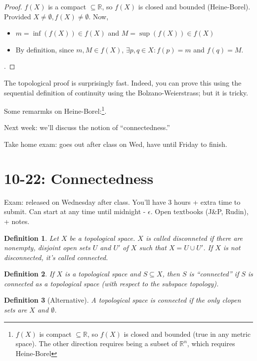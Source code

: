 \documentclass[12pt]{article}
\newtheorem*{definition}{Definition}
\newcommand{\RR}{\mathbb{R}}
\newcommand{\eps}{\epsilon}
\begin{document}
\begin{proof}
  $f(X)$ is a compact $\subseteq \RR$, so $f(X)$ is closed and bounded (Heine-Borel). Provided $X \neq \emptyset, f(X) \neq \emptyset$. Now, 
  \begin{itemize}
    \item $m = \inf (f(X) ) \in f(X)$ and $M = \sup (f(X) ) \in f(X)$
    \item By definition, since $m, M \in f(X)$, $\exists p, q \in X: f(p) = m$ and $f(q) = M$.
  \end{itemize}.
\end{proof}

The topological proof is surprisingly fast.  Indeed, you can prove this using the sequential definition of continuity using the Bolzano-Weierstrass; but it is tricky.


Some remarmks on Heine-Borel:\footnote{$f(X)$ is compact $\subseteq \RR$, so $f(X)$ is closed and bounded (true in any metric space).  The other direction requires being a subset of $\RR^n$, which requires Heine-Borel}.

Next week: we'll discuss the notion of ``connectedness.''

Take home exam: goes out after class on Wed, have until Friday to finish.

\section{10-22: Connectedness}

Exam: released on Wednesday after class.  You'll have 3 hours + extra time to submit.  Can start at any time until midnight - $\eps$.  Open textbooks (J\&P, Rudin), + notes.

\begin{definition}
  Let $X$ be a topological space.  $X$ is called disconneted if there are nonempty, disjoint open sets $U$ and $U'$ of $X$ such that $X = U \cup U'$.  If $X$ is not disconnected, it's called connected. \\
\end{definition}

\begin{definition}
  If $X$ is a topological space and $S \subseteq X$, then $S$ is ``connected'' if $S$ is connected as a topological space (with respect to the subspace topology). \\
\end{definition}

\begin{definition}[Alternative]
  A topological space is connected if the only clopen sets are $X$ and $\emptyset$. \\
\end{definition}
\end{document}
